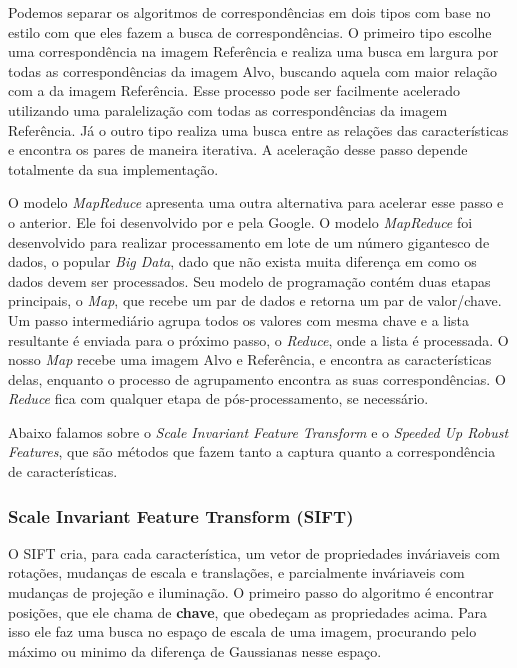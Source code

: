     Podemos separar os algoritmos de correspondências em dois tipos com base no estilo com que eles fazem a busca de 
correspondências. O primeiro tipo escolhe uma correspondência na imagem Referência e realiza uma busca em largura por
todas as correspondências da imagem Alvo, buscando aquela com maior relação com a da imagem Referência. Esse processo
pode ser facilmente acelerado utilizando uma paralelização com todas as correspondências da imagem Referência. Já o 
outro tipo realiza uma busca entre as relações das características e encontra os pares de maneira iterativa. A 
aceleração desse passo depende totalmente da sua implementação.

    O modelo \textit{MapReduce} apresenta uma outra alternativa para acelerar esse passo e o anterior. Ele foi 
desenvolvido por \cite{dean2008mapreduce} e pela Google. O modelo \textit{MapReduce} foi desenvolvido para realizar 
processamento em lote de um número gigantesco de dados, o popular \textit{Big Data}, dado que não exista muita diferença 
em como os dados devem ser processados. Seu modelo de programação contém duas etapas principais, o \textit{Map}, que 
recebe um par de dados e retorna um par de valor/chave. Um passo intermediário agrupa todos os valores com mesma chave e
a lista resultante é enviada para o próximo passo, o \textit{Reduce}, onde a lista é processada. O nosso \textit{Map} 
recebe uma imagem Alvo e Referência, e encontra as características delas, enquanto o processo de agrupamento encontra as
suas correspondências. O \textit{Reduce} fica com qualquer etapa de pós-processamento, se necessário.

  Abaixo falamos sobre o \textit{Scale Invariant Feature Transform} e o \textit{Speeded Up Robust Features}, que são
métodos que fazem tanto a captura quanto a correspondência de características.

\subsubsection{Scale Invariant Feature Transform (SIFT)}
  O SIFT cria, para cada característica, um vetor de propriedades inváriaveis com rotações, mudanças de escala e 
translações, e parcialmente inváriaveis com mudanças de projeção e iluminação. O primeiro passo do algoritmo é encontrar
posições, que ele chama de \textbf{chave}, que obedeçam as propriedades acima. Para isso ele faz uma busca no espaço
de escala de uma imagem, procurando pelo máximo ou minimo da diferença de Gaussianas nesse espaço.

